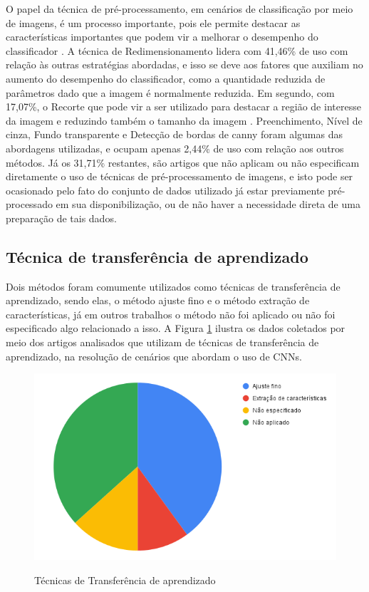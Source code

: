 \documentclass[
	12pt,				%
	oneside,			%
	a4paper,			%
	english,			%
	brazil				%
	]{abntex2ppgsi}
\begin{document}
O papel da técnica de pré-processamento, em cenários de classificação por meio de imagens, é um processo importante, pois ele permite destacar as características importantes que podem vir a melhorar o desempenho do classificador \cite{thenmozhi2019crop}. A técnica de Redimensionamento lidera com 41,46\% de uso com relação às outras estratégias abordadas, e isso se deve aos fatores que auxiliam no aumento do desempenho do classificador, como a quantidade reduzida de parâmetros dado que a imagem é normalmente reduzida. Em segundo, com 17,07\%, o Recorte que pode vir a ser utilizado para destacar a região de interesse da imagem e reduzindo também o tamanho da imagem \cite{thenmozhi2019crop}. Preenchimento, Nível de cinza, Fundo transparente e Detecção de bordas de canny foram algumas das abordagens utilizadas, e ocupam apenas 2,44\% de uso com relação aos outros métodos. Já os 31,71\% restantes, são artigos que não aplicam ou não especificam diretamente o uso de técnicas de pré-processamento de imagens, e isto pode ser ocasionado pelo fato do conjunto de dados utilizado já estar previamente pré-processado em sua disponibilização, ou de não haver a necessidade direta de uma preparação de tais dados.

\subsection{Técnica de transferência de aprendizado}
Dois métodos foram comumente utilizados como técnicas de transferência de aprendizado, sendo elas, o método ajuste fino e o método extração de características, já em outros trabalhos o método não foi aplicado ou não foi especificado algo relacionado a isso. A Figura \ref{fig:grafico_transfer-learning_vs_uso} ilustra os dados coletados por meio dos artigos analisados que utilizam de técnicas de transferência de aprendizado, na resolução de cenários que abordam o uso de CNNs.

\begin{figure}[H]
    \centering
    \caption{Técnicas de Transferência de aprendizado}
    \includegraphics[width=1.0\textwidth]{imagens/revisao_sistematica/grafico_transfer_learning_vs_uso.png}
    \label{fig:grafico_transfer-learning_vs_uso}
\end{figure}
\end{document}
